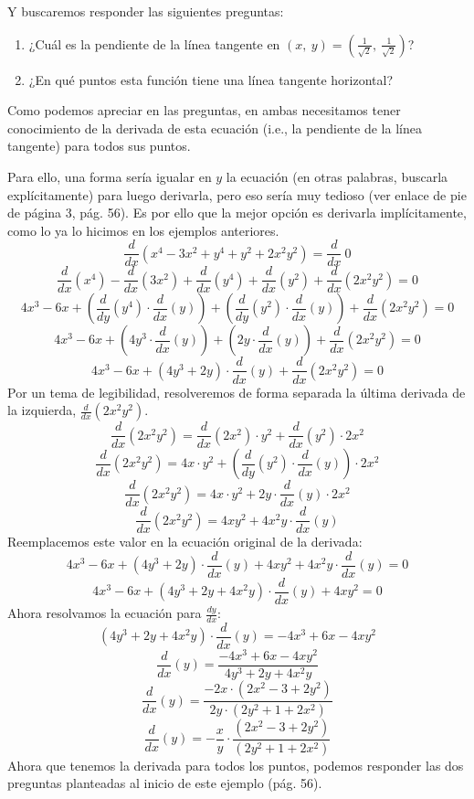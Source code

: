 \documentclass[12pt]{article}
\begin{document}
Y buscaremos responder las siguientes preguntas:

\begin{enumerate}
\item ¿Cuál es la pendiente de la línea tangente en $(x, \ y) = \left(\frac{1}{\sqrt{2}}, \ \frac{1}{\sqrt{2}}\right)$?
\item ¿En qué puntos esta función tiene una línea tangente horizontal?
\end{enumerate}

Como podemos apreciar en las preguntas, en ambas necesitamos tener conocimiento de la derivada de esta ecuación (i.e., la pendiente de la línea tangente) para todos sus puntos.

Para ello, una forma sería igualar en $y$ la ecuación (en otras palabras, buscarla explícitamente) para luego derivarla, pero eso sería muy tedioso (ver enlace de pie de página 3, pág. 56). Es por ello que la mejor opción es derivarla implícitamente, como lo ya lo hicimos en los ejemplos anteriores.
\[\frac{d}{dx}(x^{4} - 3x^{2} + y^{4} + y^{2} + 2x^{2}y^{2}) = \frac{d}{dx} \ 0\]
\[\frac{d}{dx} (x^{4}) - \frac{d}{dx}(3x^{2}) + \frac{d}{dx} (y^{4}) + \frac{d}{dx}(y^{2}) + \frac{d}{dx}(2x^{2}y^{2}) = 0\]
\[4x^{3} - 6x + \left(\frac{d}{dy} (y^{4}) \cdot \frac{d}{dx} (y)\right) + \left(\frac{d}{dy} (y^{2}) \cdot \frac{d}{dx} (y)\right) + \frac{d}{dx}(2x^{2}y^{2}) = 0\]
\[4x^{3} - 6x + \left(4y^{3} \cdot \frac{d}{dx} (y)\right) + \left(2y \cdot \frac{d}{dx} (y)\right) + \frac{d}{dx}(2x^{2}y^{2}) = 0\]
\[4x^{3} - 6x + (4y^{3} + 2y) \cdot \frac{d}{dx} (y) + \frac{d}{dx}(2x^{2}y^{2}) = 0\]
Por un tema de legibilidad, resolveremos de forma separada la última derivada de la izquierda, $\frac{d}{dx}(2x^{2}y^{2})$.
\[\frac{d}{dx}(2x^{2}y^{2}) = \frac{d}{dx}(2x^{2}) \cdot y^{2} + \frac{d}{dx}(y^{2}) \cdot 2x^{2}\]
\[\frac{d}{dx}(2x^{2}y^{2}) = 4x \cdot y^{2} + \left(\frac{d}{dy}(y^{2}) \cdot \frac{d}{dx} (y)\right) \cdot 2x^{2}\]
\[\frac{d}{dx}(2x^{2}y^{2}) = 4x \cdot y^{2} + 2y \cdot \frac{d}{dx} (y) \cdot 2x^{2}\]
\[\frac{d}{dx}(2x^{2}y^{2}) = 4xy^{2} + 4x^{2}y \cdot \frac{d}{dx} (y)\]
Reemplacemos este valor en la ecuación original de la derivada:
\[4x^{3} - 6x + (4y^{3} + 2y) \cdot \frac{d}{dx} (y) + 4xy^{2} + 4x^{2}y \cdot \frac{d}{dx}(y) = 0\]
\[4x^{3} - 6x + (4y^{3} + 2y + 4x^{2}y) \cdot \frac{d}{dx} (y) + 4xy^{2} = 0\]
Ahora resolvamos la ecuación para $\frac{dy}{dx}$:
\[(4y^{3} + 2y + 4x^{2}y) \cdot \frac{d}{dx} (y) = -4x^{3} + 6x - 4xy^{2}\]
\[\frac{d}{dx} (y) = \frac{-4x^{3} + 6x - 4xy^{2}}{4y^{3} + 2y + 4x^{2}y}\]
\[\frac{d}{dx} (y) = \frac{-2x \cdot(2x^{2} - 3 + 2y^{2})}{2y\cdot(2y^{2} + 1 + 2x^{2})}\]
\[\frac{d}{dx} (y) = -\frac{x}{y} \cdot \frac{(2x^{2} - 3 + 2y^{2})}{(2y^{2} + 1 + 2x^{2})}\]
Ahora que tenemos la derivada para todos los puntos, podemos responder las dos preguntas planteadas al inicio de este ejemplo (pág. 56).
\end{document}
